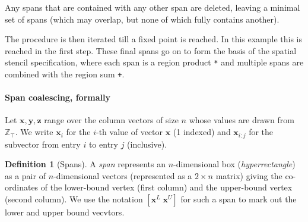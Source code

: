 \documentclass[9pt]{sigplanconf}
\newcounter{block}
\theoremstyle{definition}
\newtheorem{definition}[block]{Definition}
\newcommand{\vect}[1]{\textbf{#1}}
\begin{document}
%
Any spans that are contained with any other span are deleted,
leaving a minimal set of spans (which may overlap, but none of which
fully contains another).
\begin{center}
\end{center}
%
The procedure is then iterated till a fixed point is reached. In this
example this is reached in the first step. These final spans
go on to form the basis of the spatial stencil specification, where
each span is a region product \texttt{*} and multiple spans are
combined with the region sum \texttt{+}.


\paragraph{Span coalescing, formally}

Let $\vect{x}, \vect{y}, \vect{z}$ range over the column vectors of size
$n$ whose values are drawn from $\mathbb{Z}_\top$.
We write $\vect{x}_i$ for the $i$-th value of vector $\vect{x}$ (1
indexed) and $\vect{x}_{i:j}$ for the subvector from entry $i$ to
entry $j$ (inclusive). 

\begin{definition}[Spans]
  A \emph{span} represents an $n$-dimensional box (\emph{hyperrectangle}) as
  a pair of $n$-dimensional vectors (represented as a $2 \times n$
  matrix) giving the co-ordinates of the lower-bound vertex (first
  column) and the upper-bound vertex (second column). We use the
  notation $[\vect{x}^L \; \vect{x}^U]$ for such a span to mark out
  the lower and upper bound vecvtors. 
\end{definition}
\end{document}
